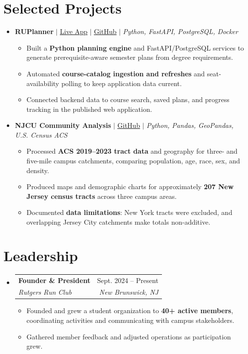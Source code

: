 \documentclass[letterpaper,10pt]{article}
\makeatletter
\newcommand{\resumeItem}[1]{\item\small{#1}}
\newcommand{\resumeSubheading}[4]{
  \vspace{1pt}\item
  \begin{tabular*}{0.97\textwidth}[t]{l@{\extracolsep{\fill}}r}
    \textbf{#1} & #2 \\
    \textit{\small #3} & \textit{\small #4} \\
  \end{tabular*}\vspace{-3pt}
}
\newcommand{\resumeProjectHeading}[1]{\vspace{3pt}\item\small{#1}\vspace{0pt}}
\newcommand{\resumeSubHeadingListStart}{\begin{itemize}[leftmargin=0.15in,label={},itemsep=0pt,topsep=0pt]}
\newcommand{\resumeSubHeadingListEnd}{\end{itemize}}
\newcommand{\resumeItemListStart}{\begin{itemize}[leftmargin=0.15in,label=\textbullet,itemsep=-2pt,topsep=0pt]}
\newcommand{\resumeItemListEnd}{\end{itemize}\vspace{0pt}}
\makeatother
\begin{document}
\section{Selected Projects}
\resumeSubHeadingListStart
  \resumeProjectHeading{\textbf{RUPlanner} $|$ \href{https://ruplanner.app/}{\underline{Live App}} $|$ \href{https://github.com/ameer-rah/RUPlanner}{\underline{GitHub}} $|$ \emph{Python, FastAPI, PostgreSQL, Docker}}
    \resumeItemListStart
      \resumeItem{Built a \textbf{Python planning engine} and FastAPI/PostgreSQL services to generate prerequisite-aware semester plans from degree requirements.}
      \resumeItem{Automated \textbf{course-catalog ingestion and refreshes} and seat-availability polling to keep application data current.}
      \resumeItem{Connected backend data to course search, saved plans, and progress tracking in the published web application.}
    \resumeItemListEnd
  \resumeProjectHeading{\textbf{NJCU Community Analysis} $|$ \href{https://github.com/ameer-rah/njcu-community-analysis-internal}{\underline{GitHub}} $|$ \emph{Python, Pandas, GeoPandas, U.S. Census ACS}}
    \resumeItemListStart
      \resumeItem{Processed \textbf{ACS 2019--2023 tract data} and geography for three- and five-mile campus catchments, comparing population, age, race, sex, and density.}
      \resumeItem{Produced maps and demographic charts for approximately \textbf{207 New Jersey census tracts} across three campus areas.}
      \resumeItem{Documented \textbf{data limitations}: New York tracts were excluded, and overlapping Jersey City catchments make totals non-additive.}
    \resumeItemListEnd
\resumeSubHeadingListEnd

\section{Leadership}
\resumeSubHeadingListStart
  \resumeSubheading{Founder \& President}{Sept. 2024 -- Present}
    {Rutgers Run Club}{New Brunswick, NJ}
    \resumeItemListStart
      \resumeItem{Founded and grew a student organization to \textbf{40+ active members}, coordinating activities and communicating with campus stakeholders.}
      \resumeItem{Gathered member feedback and adjusted operations as participation grew.}
    \resumeItemListEnd
\resumeSubHeadingListEnd
\end{document}
